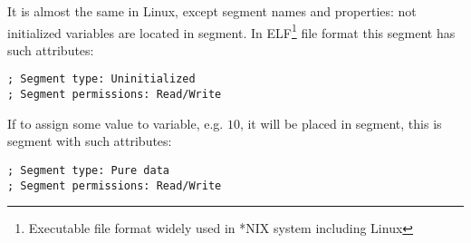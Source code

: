 {It is almost the same in Linux, except segment names and properties: 
not initialized variables are located in  segment. 
In ELF\footnote{Executable file format widely used in *NIX system including Linux} 
file format this segment has such attributes:}

\begin{lstlisting}
; Segment type: Uninitialized
; Segment permissions: Read/Write
\end{lstlisting}

{If to assign some value to variable, e.g. $10$, it will be placed in  segment, 
this is segment with such attributes:}

\begin{lstlisting}
; Segment type: Pure data
; Segment permissions: Read/Write
\end{lstlisting}



